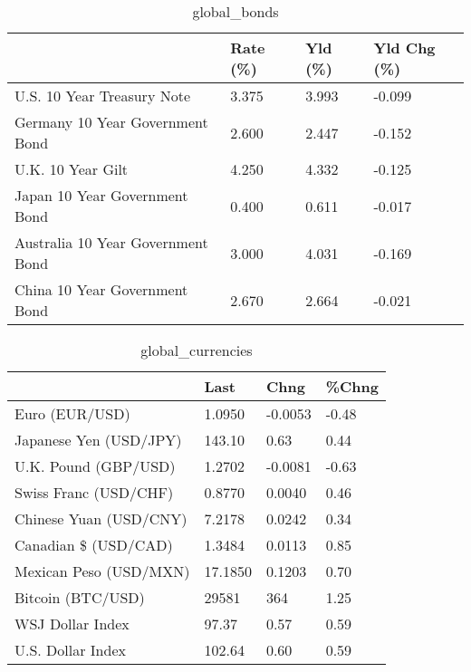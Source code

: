 \documentclass{article}%
\begin{document}
%


\begin{table}[htbp]%
\caption{global\_bonds}%
\centering%
\begin{adjustbox}{width=1\textwidth}%
\begin{tabular}{llll}
\toprule
                                  & Rate (\%) & Yld (\%) & Yld Chg (\%) \\
\midrule
       U.S. 10 Year Treasury Note &    3.375 &   3.993 &      -0.099 \\
  Germany 10 Year Government Bond &    2.600 &   2.447 &      -0.152 \\
                U.K. 10 Year Gilt &    4.250 &   4.332 &      -0.125 \\
    Japan 10 Year Government Bond &    0.400 &   0.611 &      -0.017 \\
Australia 10 Year Government Bond &    3.000 &   4.031 &      -0.169 \\
    China 10 Year Government Bond &    2.670 &   2.664 &      -0.021 \\
\bottomrule
\end{tabular}
%
\end{adjustbox}%
\end{table}

%


\begin{table}[htbp]%
\caption{global\_currencies}%
\centering%
\begin{adjustbox}{width=1\textwidth}%
\begin{tabular}{llll}
\toprule
                       &    Last &    Chng & \%Chng \\
\midrule
        Euro (EUR/USD) &  1.0950 & -0.0053 & -0.48 \\
Japanese Yen (USD/JPY) &  143.10 &    0.63 &  0.44 \\
  U.K. Pound (GBP/USD) &  1.2702 & -0.0081 & -0.63 \\
 Swiss Franc (USD/CHF) &  0.8770 &  0.0040 &  0.46 \\
Chinese Yuan (USD/CNY) &  7.2178 &  0.0242 &  0.34 \\
  Canadian \$ (USD/CAD) &  1.3484 &  0.0113 &  0.85 \\
Mexican Peso (USD/MXN) & 17.1850 &  0.1203 &  0.70 \\
     Bitcoin (BTC/USD) &   29581 &     364 &  1.25 \\
      WSJ Dollar Index &   97.37 &    0.57 &  0.59 \\
     U.S. Dollar Index &  102.64 &    0.60 &  0.59 \\
\bottomrule
\end{tabular}
%
\end{adjustbox}%
\end{table}
\end{document}
